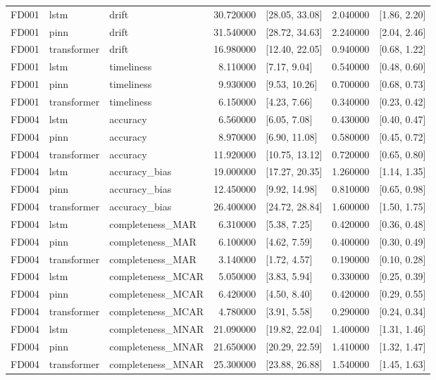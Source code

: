 \begin{table}
\begin{tabular}{lllrlrl}
FD001 & lstm & drift & 30.720000 & [28.05, 33.08] & 2.040000 & [1.86, 2.20] \\
FD001 & pinn & drift & 31.540000 & [28.72, 34.63] & 2.240000 & [2.04, 2.46] \\
FD001 & transformer & drift & 16.980000 & [12.40, 22.05] & 0.940000 & [0.68, 1.22] \\
FD001 & lstm & timeliness & 8.110000 & [7.17, 9.04] & 0.540000 & [0.48, 0.60] \\
FD001 & pinn & timeliness & 9.930000 & [9.53, 10.26] & 0.700000 & [0.68, 0.73] \\
FD001 & transformer & timeliness & 6.150000 & [4.23, 7.66] & 0.340000 & [0.23, 0.42] \\
FD004 & lstm & accuracy & 6.560000 & [6.05, 7.08] & 0.430000 & [0.40, 0.47] \\
FD004 & pinn & accuracy & 8.970000 & [6.90, 11.08] & 0.580000 & [0.45, 0.72] \\
FD004 & transformer & accuracy & 11.920000 & [10.75, 13.12] & 0.720000 & [0.65, 0.80] \\
FD004 & lstm & accuracy\_bias & 19.000000 & [17.27, 20.35] & 1.260000 & [1.14, 1.35] \\
FD004 & pinn & accuracy\_bias & 12.450000 & [9.92, 14.98] & 0.810000 & [0.65, 0.98] \\
FD004 & transformer & accuracy\_bias & 26.400000 & [24.72, 28.84] & 1.600000 & [1.50, 1.75] \\
FD004 & lstm & completeness\_MAR & 6.310000 & [5.38, 7.25] & 0.420000 & [0.36, 0.48] \\
FD004 & pinn & completeness\_MAR & 6.100000 & [4.62, 7.59] & 0.400000 & [0.30, 0.49] \\
FD004 & transformer & completeness\_MAR & 3.140000 & [1.72, 4.57] & 0.190000 & [0.10, 0.28] \\
FD004 & lstm & completeness\_MCAR & 5.050000 & [3.83, 5.94] & 0.330000 & [0.25, 0.39] \\
FD004 & pinn & completeness\_MCAR & 6.420000 & [4.50, 8.40] & 0.420000 & [0.29, 0.55] \\
FD004 & transformer & completeness\_MCAR & 4.780000 & [3.91, 5.58] & 0.290000 & [0.24, 0.34] \\
FD004 & lstm & completeness\_MNAR & 21.090000 & [19.82, 22.04] & 1.400000 & [1.31, 1.46] \\
FD004 & pinn & completeness\_MNAR & 21.650000 & [20.29, 22.59] & 1.410000 & [1.32, 1.47] \\
FD004 & transformer & completeness\_MNAR & 25.300000 & [23.88, 26.88] & 1.540000 & [1.45, 1.63] \\

\end{tabular}
\end{table}
